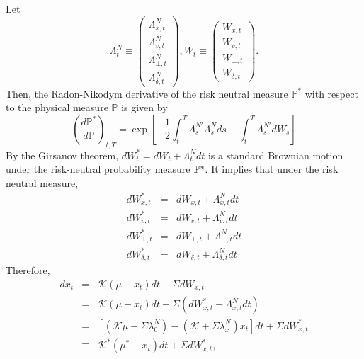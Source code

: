 \documentclass{article}
\begin{document}
Let 
\begin{equation*}
\Lambda _{t}^{N}\equiv \left( 
\begin{array}{c}
\Lambda _{x,t}^{N} \\ 
\Lambda _{v,t}^{N} \\ 
\Lambda _{\bot ,t}^{N} \\ 
\Lambda _{\delta ,t}^{N}%
\end{array}%
\right) ,W_{t}\equiv \left( 
\begin{array}{c}
W_{x,t} \\ 
W_{v,t} \\ 
W_{\bot ,t} \\ 
W_{\delta ,t}%
\end{array}%
\right) .
\end{equation*}%
Then, the Radon-Nikodym derivative of the risk neutral measure $\mathbb{P}%
^{\ast }$ with respect to the physical measure $\mathbb{P}$ is given by%
\begin{equation}
\left( \frac{d\mathbb{P}^{\ast }}{d\mathbb{P}}\right) _{t,T}=\exp \left[ -%
\frac{1}{2}\int_{t}^{T}\Lambda _{s}^{N\prime }\Lambda
_{s}^{N}ds-\int_{t}^{T}\Lambda _{s}^{N\prime }dW_{s}\right]
\end{equation}%
By the Girsanov theorem, $dW_{t}^{\ast }=dW_{t}+\Lambda _{t}^{N}dt$ is a
standard Brownian motion under the risk-neutral probability measure $\mathbb{%
P}^{\ast }$. It implies that under the risk neutral measure, 
\begin{eqnarray*}
dW_{x,t}^{\ast } &=&dW_{x,t}+\Lambda _{x,t}^{N}dt \\
dW_{v,t}^{\ast } &=&dW_{v,t}+\Lambda _{v,t}^{N}dt \\
dW_{\bot ,t}^{\ast } &=&dW_{\bot ,t}+\Lambda _{\bot ,t}^{N}dt \\
dW_{\delta ,t}^{\ast } &=&dW_{\delta ,t}+\Lambda _{\delta ,t}^{N}dt
\end{eqnarray*}%
Therefore,%
\begin{eqnarray*}
dx_{t} &=&\mathcal{K}\left( \mu -x_{t}\right) dt+\Sigma dW_{x,t} \\
&=&\mathcal{K}\left( \mu -x_{t}\right) dt+\Sigma \left( dW_{x,t}^{\ast
}-\Lambda _{x,t}^{N}dt\right) \\
&=&\left[ \left( \mathcal{K}\mu -\Sigma \lambda _{0}^{N}\right) -\left( 
\mathcal{K}+\Sigma \lambda _{x}^{N}\right) x_{t}\right] dt+\Sigma
dW_{x,t}^{\ast } \\
&\equiv &\mathcal{K}^{\ast }\left( \mu ^{\ast }-x_{t}\right) dt+\Sigma
dW_{x,t}^{\ast },
\end{eqnarray*}%
\end{document}
